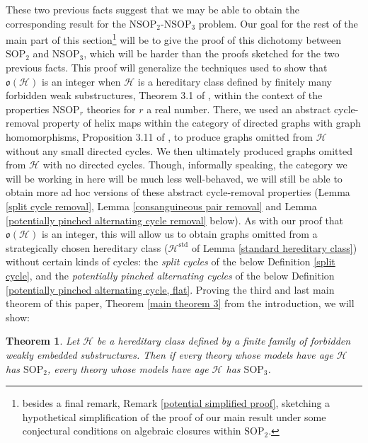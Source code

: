 \documentclass{amsart}
\newtheorem{theorem}{Theorem}[section]
\theoremstyle{definition}
\theoremstyle{remark}
\numberwithin{equation}{section}
\begin{document}
These two previous facts suggest that we may be able to obtain the corresponding result for the $\mathrm{NSOP}_{2}$-$\mathrm{NSOP}_{3}$ problem. Our goal for the rest of the main part of this section\footnote{besides a final remark, Remark \ref{potential simplified proof}, sketching a hypothetical simplification of the proof of our main result under some conjectural conditions on algebraic closures within $\mathrm{SOP}_{2}$.} will be to give the proof of this dichotomy between $\mathrm{SOP}_{2}$ and $\mathrm{NSOP}_{3}$, which will be harder than the proofs sketched for the two previous facts. This proof will generalize the techniques used to show that $\mathfrak{o}(\mathcal{H})$ is an integer when $\mathcal{H}$ is a hereditary class defined by finitely many forbidden weak substructures, Theorem 3.1 of \cite{ApproxOrder}, within the context of the properties $\mathrm{NSOP}_{r}$ theories for $r$ a real number. There, we used an abstract cycle-removal property of helix maps within the category of directed graphs with graph homomorphisms, Proposition 3.11 of \cite{ApproxOrder}, to produce graphs omitted from $\mathcal{H}$ without any small directed cycles. We then ultimately produced graphs omitted from $\mathcal{H}$ with no directed cycles. Though, informally speaking, the category we will be working in here will be much less well-behaved, we will still be able to obtain more ad hoc versions of these abstract cycle-removal properties (Lemma \ref{split cycle removal}, Lemma \ref{consanguineous pair removal} and Lemma \ref{potentially pinched alternating cycle removal} below). As with our proof that $\mathfrak{o}(\mathcal{H})$ is an integer, this will allow us to obtain graphs omitted from a strategically chosen hereditary class ($\mathcal{H}^{\mathrm{std}}$ of Lemma \ref{standard hereditary class}) without certain kinds of cycles: the \textit{split cycles} of the below Definition \ref{split cycle}, and the \textit{potentially pinched alternating cycles} of the below Definition \ref{potentially pinched alternating cycle, flat}. Proving the third and last main theorem of this paper, Theorem \ref{main theorem 3} from the introduction, we will show:


\begin{theorem}
\label{main theorem 3, restated}   Let $\mathcal{H}$ be a hereditary class defined by a finite family of forbidden weakly embedded substructures. Then if every theory whose models have age $\mathcal{H}$ has $\mathrm{SOP}_{2}$, every theory whose models have age $\mathcal{H}$ has $\mathrm{SOP}_{3}$.
\end{theorem}
\end{document}
